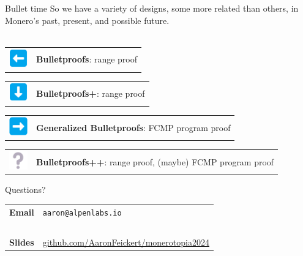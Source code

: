 \documentclass[aspectratio=169]{beamer}
\begin{document}
\begin{frame}{Bullet time}
    So we have a variety of designs, some more related than others, in Monero's past, present, and possible future. \\~\\

    \begin{tabular}{>{\arraybackslash}m{40px} >{\arraybackslash}m{320px}}
        \includegraphics[width=30px]{images/arrow-left.png} & \textbf{Bulletproofs}: range proof
    \end{tabular}

    \begin{tabular}{>{\arraybackslash}m{40px} >{\arraybackslash}m{320px}}
        \includegraphics[width=30px]{images/arrow-down.png} & \textbf{Bulletproofs+}: range proof
    \end{tabular}

    \begin{tabular}{>{\arraybackslash}m{40px} >{\arraybackslash}m{320px}}
        \includegraphics[width=30px]{images/arrow-right.png} & \textbf{Generalized Bulletproofs}: FCMP program proof
    \end{tabular}

    \begin{tabular}{>{\arraybackslash}m{40px} >{\arraybackslash}m{320px}}
        \includegraphics[width=30px]{images/question.png} & \textbf{Bulletproofs++}: range proof, (maybe) FCMP program proof
    \end{tabular}
\end{frame}


\begin{frame}{Questions?}
    \Large
    \begin{center}
        \begin{tabular}{ll}
            \textbf{Email} & \texttt{aaron@alpenlabs.io} \\~\\
            \textbf{Slides} & \url{github.com/AaronFeickert/monerotopia2024}
        \end{tabular}
    \end{center}
\end{frame}
\end{document}
